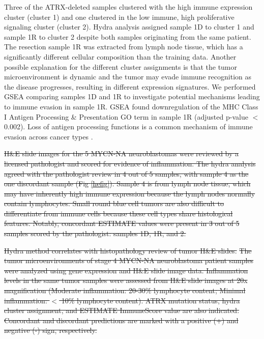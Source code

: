 \documentclass[10pt,letterpaper]{article}
\providecommand{\DIFdeltex}[1]{{\protect\color{red}\sout{#1}}}                      %
\providecommand{\DIFdelbegin}{} %
\providecommand{\DIFdelFL}[1]{\DIFdel{#1}} %
\providecommand{\DIFdel}[1]{\texorpdfstring{\DIFdeltex{#1}}{}} %
\newcommand{\DIFscaledelfig}{0.5}
\newlength{\DIFdelgraphicswidth} %
\newlength{\DIFdelgraphicsheight} %
\newcommand{\DIFdelincludegraphics}[2][]{%
\sbox{\DIFdelgraphicsbox}{\DIFOincludegraphics[#1]{#2}}%
\settoboxwidth{\DIFdelgraphicswidth}{\DIFdelgraphicsbox} %
\settoboxtotalheight{\DIFdelgraphicsheight}{\DIFdelgraphicsbox} %
\scalebox{\DIFscaledelfig}{%
\parbox[b]{\DIFdelgraphicswidth}{\usebox{\DIFdelgraphicsbox}\\[-\baselineskip] \rule{\DIFdelgraphicswidth}{0em}}\llap{\resizebox{\DIFdelgraphicswidth}{\DIFdelgraphicsheight}{%
\setlength{\unitlength}{\DIFdelgraphicswidth}%
\begin{picture}(1,1)%
\thicklines\linethickness{2pt} %
{\color[rgb]{1,0,0}\put(0,0){\framebox(1,1){}}}%
{\color[rgb]{1,0,0}\put(0,0){\line( 1,1){1}}}%
{\color[rgb]{1,0,0}\put(0,1){\line(1,-1){1}}}%
\end{picture}%
}\hspace*{3pt}}} %
} %
\DeclareRobustCommand{\DIFdelbegin}{\DIFOdelbegin \let\includegraphics\DIFdelincludegraphics} %
\begin{document}
Three of the ATRX-deleted samples clustered with the high immune expression cluster (cluster 1) and one clustered in the low immune, high proliferative signaling cluster (cluster 2). Hydra analysis assigned sample 1D to cluster 1 and sample 1R to cluster 2 despite both samples originating from the same patient. The resection sample 1R was extracted from lymph node tissue, which has a significantly different cellular composition than the training data. Another possible explanation for the different cluster assignments is that the tumor microenvironment is dynamic and the tumor may evade immune recognition as the disease progresses, resulting in different expression signatures. We performed GSEA comparing samples 1D and 1R to investigate potential mechanisms leading to immune evasion in sample 1R. GSEA found downregulation of the MHC Class I Antigen Processing \& Presentation GO term in sample 1R (adjusted p-value $<$ 0.002). Loss of antigen processing functions is a common mechanism of immune evasion across cancer types \cite{reevesAntigenProcessingImmune2017}. \DIFdelbegin %

\DIFdel{H\&E slide images for the 5 MYCN-NA neuroblastomas were reviewed by a licensed pathologist and scored for evidence of inflammation. The hydra analysis agreed with the pathologist review in 4 out of 5 samples, with sample 4 as the one discordant sample (Fig \ref{hefig}). Sample 4 is from lymph node tissue, which may have inherently high immune expression because the lymph nodes normally contain lymphocytes. Small round blue cell tumors are also difficult to differentiate from immune cells because these cell types share histological features. Notably, concordant ESTIMATE values were present in 3 out of 5 samples scored by the pathologist: samples 1D, 1R, and 2. 
}%

{%
\DIFdelFL{Hydra method correlates with histopathology review of tumor H\&E slides.}%
\DIFdelFL{The tumor microenvironments of stage 4 MYCN-NA neuroblastoma patient samples were analyzed using gene expression and H\&E slide image data. Inflammation levels in the same tumor samples were assessed from H\&E slide images at 20x magnification (Moderate inflammation: 20-30\% lymphocyte content; Minimal inflammation: $<$ 10\% lymphocyte content). ATRX mutation status, hydra cluster assignment, and ESTIMATE ImmuneScore value are also indicated. Concordant and discordant predictions are marked with a positive (+) and negative (-) sign, respectively.}}
\end{document}
